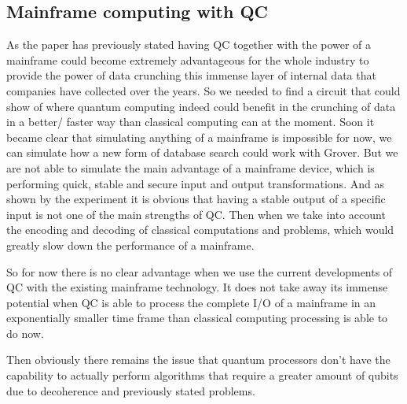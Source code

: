 \subsection{Mainframe computing with QC}

As the paper has previously stated having QC together with the power of a mainframe could become extremely advantageous for the whole industry to provide the power of data crunching this immense layer of internal data that companies have collected over the years. So we needed to find a circuit that could show of where quantum computing indeed could benefit in the crunching of data in a better/ faster way than classical computing can at the moment. Soon it became clear that simulating anything of a mainframe is impossible for now, we can simulate how a new form of database search could work with Grover. But we are not able to simulate the main advantage of a mainframe device, which is performing quick, stable and secure input and output transformations. And as shown by the experiment it is obvious that having a stable output of a specific input is not one of the main strengths of QC. Then when we take into account the encoding and decoding of classical computations and problems, which would greatly slow down the performance of a mainframe.

So for now there is no clear advantage when we use the current developments of QC with the existing mainframe technology. It does not take away its immense potential when QC is able to process the complete I/O of a mainframe in an exponentially smaller time frame than classical computing processing is able to do now.

Then obviously there remains the issue that quantum processors don't have the capability to actually perform algorithms that require a greater amount of qubits due to decoherence and previously stated problems.


